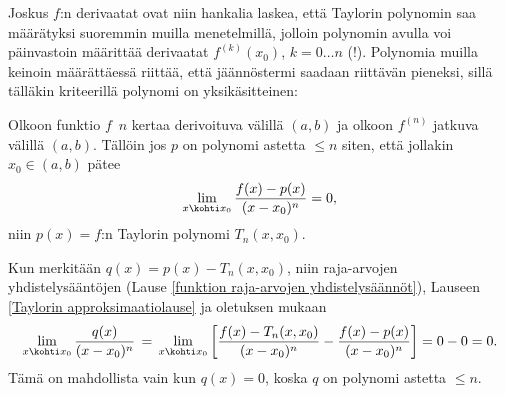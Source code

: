 Joskus $f$:n derivaatat ovat niin hankalia laskea, että Taylorin polynomin saa määrätyksi 
suoremmin muilla menetelmillä, jolloin polynomin avulla voi päinvastoin määrittää derivaatat 
$f^{(k)}(x_0)$, $k=0\ldots n$ (!). Polynomia muilla keinoin määrättäessä riittää, että 
jäännöstermi saadaan riittävän pieneksi, sillä tälläkin kriteerillä polynomi on
yksikäsitteinen:
\begin{Prop} \label{Taylor-prop}
Olkoon funktio $f$ $\,n$ kertaa derivoituva välillä $(a,b)$ ja olkoon $f^{(n)}$ jatkuva
välillä $(a,b)$. Tällöin jos $p$ on polynomi astetta $\le n$ siten, että jollakin
$x_0\in(a,b)$ pätee
\[
\lim_{x \kohti x_0} \frac{f(x)-p(x)}{(x-x_0)^n}=0,
\]
niin $p(x) = f$:n Taylorin polynomi $T_n(x,x_0)$.
\end{Prop}
\tod Kun merkitään $q(x)=p(x)-T_n(x,x_0)$, niin raja-arvojen yhdistelysääntöjen
(Lause \ref{funktion raja-arvojen yhdistelysäännöt}), Lauseen
\ref{Taylorin approksimaatiolause} ja oletuksen mukaan
\[
\lim_{x \kohti x_0} \frac{q(x)}{(x-x_0)^n} 
     \,=\, \lim_{x \kohti x_0} \left[\frac{f(x)-T_n(x,x_0)}{(x-x_0)^n}
                                 - \frac{f(x)-p(x)}{(x-x_0)^n}\right] = 0-0 = 0.
\]
Tämä on mahdollista vain kun $q(x)=0$, koska $q$ on polynomi astetta $\le n$. \loppu

